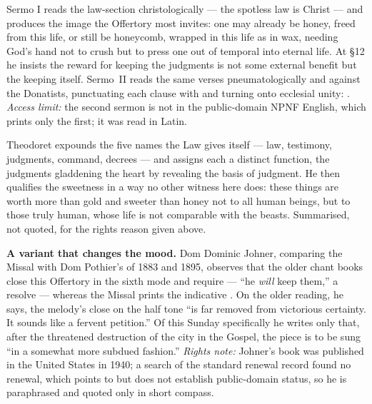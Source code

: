 \begin{witnessnote}
Sermo I reads the law-section christologically --- the spotless law is Christ
--- and produces the image the Offertory most invites: one may already be
honey, freed from this life, or still be honeycomb, wrapped in this life as in
wax, needing God's hand not to crush but to press one out of temporal into
eternal life. At §12 he insists the reward for keeping the judgments is not
some external benefit but the keeping itself. Sermo~II reads the same verses
pneumatologically and against the Donatists, punctuating each clause with
 and turning 
onto ecclesial unity: . \textit{Access limit:} the second sermon is not in the
public-domain NPNF English, which prints only the first; it was read in Latin.
\end{witnessnote}

\begin{witnessnote}
Theodoret expounds the five names the Law gives itself --- law, testimony,
judgments, command, decrees --- and assigns each a distinct function, the
judgments gladdening the heart by revealing the basis of judgment. He then
qualifies the sweetness in a way no other witness here does: these things are
worth more than gold and sweeter than honey not to all human beings, but to
those truly human, whose life is not comparable with the beasts. Summarised,
not quoted, for the rights reason given above.
\end{witnessnote}

\textbf{A variant that changes the mood.} Dom Dominic Johner, comparing the
Missal with Dom Pothier's  of 1883 and 1895, observes
that the older chant books close this Offertory in the sixth mode and require
 --- ``he \textit{will} keep them,'' a resolve --- whereas the
Missal prints the indicative . On the older reading, he says,
the melody's close on the half tone ``is far removed from victorious
certainty. It sounds like a fervent petition.'' Of this Sunday specifically he
writes only that, after the threatened destruction of the city in the Gospel,
the piece is to be sung ``in a somewhat more subdued fashion.''
\textit{Rights note:} Johner's book was published in the United States in
1940; a search of the standard renewal record found no renewal, which points
to but does not establish public-domain status, so he is paraphrased and
quoted only in short compass.

